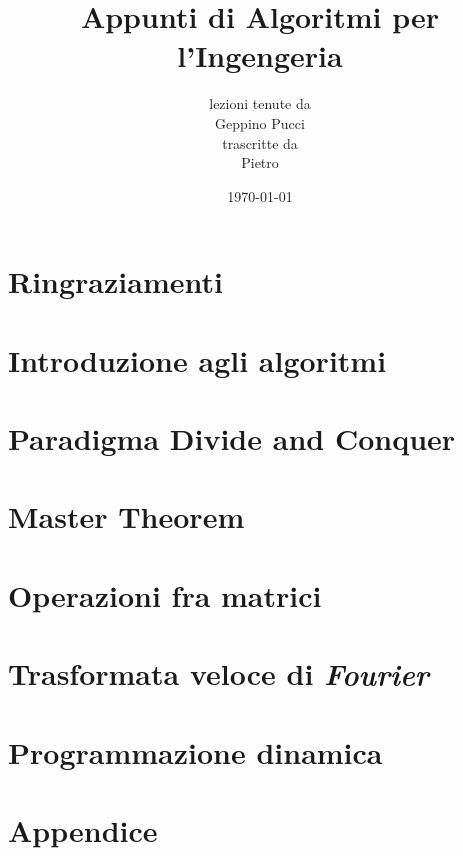 \documentclass[a4paper,oneside]{book}
\title{Appunti di Algoritmi per l'Ingengeria}
\author{lezioni tenute da\\ Geppino Pucci \\ trascritte da \\ Pietro}
\date{\today}
\theoremstyle{definition}
\theoremstyle{theorem}
\theoremstyle{theorem}
\begin{document}
\pagestyle{plain}

% 
\maketitle

\cleardoublepage

\frontmatter %

\chapter*{Ringraziamenti}


\tableofcontents

\mainmatter

\pagestyle{fancy}

\chapter{Introduzione agli algoritmi}


\chapter{Paradigma Divide and Conquer}


\chapter{Master Theorem}


\chapter{Operazioni fra matrici}


\chapter{Trasformata veloce di \textit{Fourier}}


\chapter{Programmazione dinamica}


\cleardoublepage


\cleardoublepage

\appendix

\chapter{Appendice}

\end{document}
